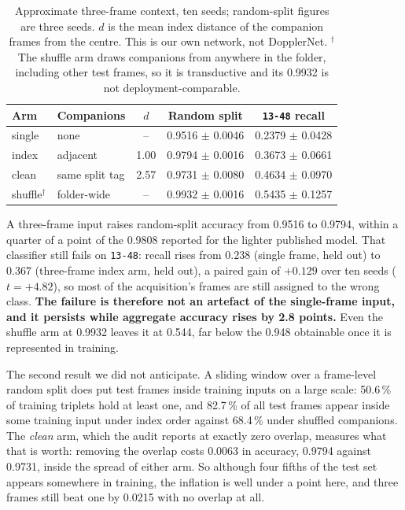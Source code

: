 \documentclass[conference]{IEEEtran}
\begin{document}
\begin{table}[t]
\caption{Approximate three-frame context, ten seeds; random-split figures
are three seeds. $d$ is the mean index distance of the companion frames from
the centre. This is our own network, not DopplerNet. $^{\dagger}$The shuffle
arm draws companions from anywhere in the folder, including other test
frames, so it is transductive and its 0.9932 is not deployment-comparable.}
\label{tab:temporal}
\centering
\small
\setlength{\tabcolsep}{3pt}
\begin{tabular}{@{}llccc@{}}
\toprule
Arm & Companions & $d$ & Random split & \texttt{13-48} recall \\
\midrule
single  & none            & --   & 0.9516 $\pm$ 0.0046 & 0.2379 $\pm$ 0.0428 \\
index   & adjacent        & 1.00 & 0.9794 $\pm$ 0.0016 & 0.3673 $\pm$ 0.0661 \\
clean   & same split tag  & 2.57 & 0.9731 $\pm$ 0.0080 & 0.4634 $\pm$ 0.0970 \\
shuffle$^{\dagger}$ & folder-wide & -- & 0.9932 $\pm$ 0.0016 & 0.5435 $\pm$ 0.1257 \\
\bottomrule
\end{tabular}
\end{table}

A three-frame input raises random-split accuracy from 0.9516 to 0.9794, within a quarter of a point of the 0.9808 reported for the lighter published model. That classifier still fails on \texttt{13-48}: recall rises from 0.238 (single frame, held out) to 0.367 (three-frame index arm, held out), a paired gain of $+0.129$ over ten seeds ($t=+4.82$), so most of the acquisition's frames are still assigned to the wrong class. \textbf{The failure is therefore not an artefact of the single-frame input, and it persists while aggregate accuracy rises by 2.8 points.} Even the shuffle arm at 0.9932 leaves it at 0.544, far below the 0.948 obtainable once it is represented in training.

The second result we did not anticipate. A sliding window over a frame-level random split does put test frames inside training inputs on a large scale: 50.6\,\% of training triplets hold at least one, and 82.7\,\% of all test frames appear inside some training input under index order against 68.4\,\% under shuffled companions. The \emph{clean} arm, which the audit reports at exactly zero overlap, measures what that is worth: removing the overlap costs 0.0063 in accuracy, 0.9794 against 0.9731, inside the spread of either arm. So although four fifths of the test set appears somewhere in training, the inflation is well under a point here, and three frames still beat one by 0.0215 with no overlap at all.
\end{document}
